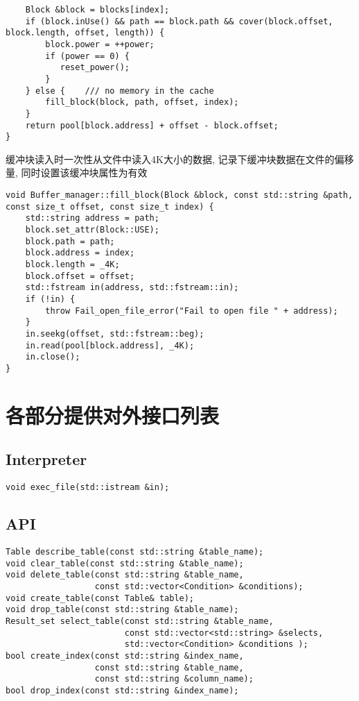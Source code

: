 \documentclass[10pt]{article}
\begin{document}
\begin{CJK}{UTF8}{gkai}
\begin{lstlisting}
    Block &block = blocks[index];
    if (block.inUse() && path == block.path && cover(block.offset, block.length, offset, length)) {
        block.power = ++power;
        if (power == 0) {
           reset_power();
        }
    } else {    /// no memory in the cache
        fill_block(block, path, offset, index);
    }
    return pool[block.address] + offset - block.offset;
}
\end{lstlisting}
缓冲块读入时一次性从文件中读入4K大小的数据, 记录下缓冲块数据在文件的偏移量, 同时设置该缓冲块属性为有效
\begin{lstlisting}
void Buffer_manager::fill_block(Block &block, const std::string &path, const size_t offset, const size_t index) {
    std::string address = path;
    block.set_attr(Block::USE);
    block.path = path;
    block.address = index;
    block.length = _4K;
    block.offset = offset;
    std::fstream in(address, std::fstream::in);
    if (!in) {
        throw Fail_open_file_error("Fail to open file " + address);
    }
    in.seekg(offset, std::fstream::beg);
    in.read(pool[block.address], _4K);
    in.close();
}
\end{lstlisting}
	
	\section{各部分提供对外接口列表}
\subsection{Interpreter}
\begin{lstlisting}
void exec_file(std::istream &in);
\end{lstlisting}

\subsection{API}
	\begin{lstlisting}
Table describe_table(const std::string &table_name);
void clear_table(const std::string &table_name);	
void delete_table(const std::string &table_name, 
				  const std::vector<Condition> &conditions);
void create_table(const Table& table);	
void drop_table(const std::string &table_name);
Result_set select_table(const std::string &table_name,
						const std::vector<std::string> &selects,
						std::vector<Condition> &conditions );
bool create_index(const std::string &index_name, 
				  const std::string &table_name,
				  const std::string &column_name);	
bool drop_index(const std::string &index_name);
	\end{lstlisting}



\end{CJK}
\end{document}

